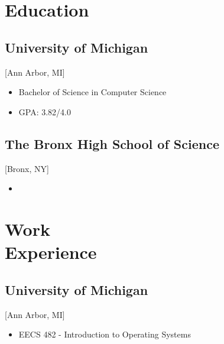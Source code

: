 \documentclass{mycv}
\begin{document}
\maketitle%

\section{Education}


\subsection{University of Michigan}[Ann Arbor, MI]
\vspace{-\parskip}%
\begin{itemize}[label={}]
  \item Bachelor of Science in Computer Science 
  \item GPA: 3.82/4.0
\end{itemize}

\subsection{The Bronx High School of Science}[Bronx, NY]
\vspace{-\parskip}%
\begin{itemize}[label={}]
  \item {}
\end{itemize}

\section{Work\\Experience}
\subsection{University of Michigan}[Ann Arbor, MI]
\begin{positions}
\end{positions}
\begin{itemize}
  \item EECS 482 - Introduction to Operating Systems
\end{itemize}
\end{document}

